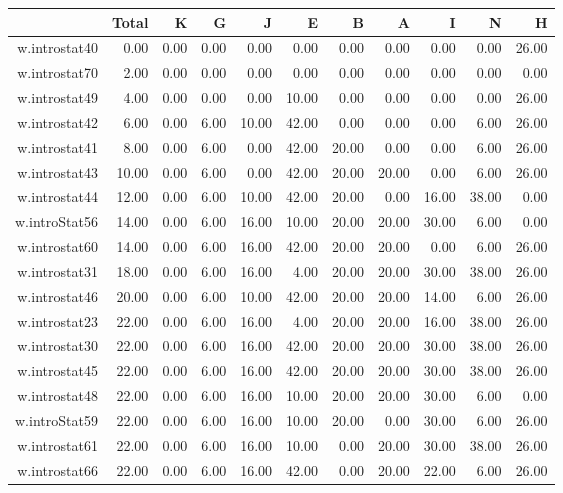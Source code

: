 \documentclass[12pt,english,nohyper]{tufte-handout}\usepackage[]{graphicx}\usepackage[]{color}
\begin{document}
\begin{longtable}{rrrrrrrrrrr}
  \hline
 & Total & K & G & J & E & B & A & I & N & H \\ 
  \hline
w.introstat40 & 0.00 & 0.00 & 0.00 & 0.00 & 0.00 & 0.00 & 0.00 & 0.00 & 0.00 & 26.00 \\ 
  w.introstat70 & 2.00 & 0.00 & 0.00 & 0.00 & 0.00 & 0.00 & 0.00 & 0.00 & 0.00 & 0.00 \\ 
  w.introstat49 & 4.00 & 0.00 & 0.00 & 0.00 & 10.00 & 0.00 & 0.00 & 0.00 & 0.00 & 26.00 \\ 
  w.introstat42 & 6.00 & 0.00 & 6.00 & 10.00 & 42.00 & 0.00 & 0.00 & 0.00 & 6.00 & 26.00 \\ 
  w.introstat41 & 8.00 & 0.00 & 6.00 & 0.00 & 42.00 & 20.00 & 0.00 & 0.00 & 6.00 & 26.00 \\ 
  w.introstat43 & 10.00 & 0.00 & 6.00 & 0.00 & 42.00 & 20.00 & 20.00 & 0.00 & 6.00 & 26.00 \\ 
  w.introstat44 & 12.00 & 0.00 & 6.00 & 10.00 & 42.00 & 20.00 & 0.00 & 16.00 & 38.00 & 0.00 \\ 
  w.introStat56 & 14.00 & 0.00 & 6.00 & 16.00 & 10.00 & 20.00 & 20.00 & 30.00 & 6.00 & 0.00 \\ 
  w.introstat60 & 14.00 & 0.00 & 6.00 & 16.00 & 42.00 & 20.00 & 20.00 & 0.00 & 6.00 & 26.00 \\ 
  w.introstat31 & 18.00 & 0.00 & 6.00 & 16.00 & 4.00 & 20.00 & 20.00 & 30.00 & 38.00 & 26.00 \\ 
  w.introstat46 & 20.00 & 0.00 & 6.00 & 10.00 & 42.00 & 20.00 & 20.00 & 14.00 & 6.00 & 26.00 \\ 
  w.introstat23 & 22.00 & 0.00 & 6.00 & 16.00 & 4.00 & 20.00 & 20.00 & 16.00 & 38.00 & 26.00 \\ 
  w.introstat30 & 22.00 & 0.00 & 6.00 & 16.00 & 42.00 & 20.00 & 20.00 & 30.00 & 38.00 & 26.00 \\ 
  w.introstat45 & 22.00 & 0.00 & 6.00 & 16.00 & 42.00 & 20.00 & 20.00 & 30.00 & 38.00 & 26.00 \\ 
  w.introstat48 & 22.00 & 0.00 & 6.00 & 16.00 & 10.00 & 20.00 & 20.00 & 30.00 & 6.00 & 0.00 \\ 
  w.introStat59 & 22.00 & 0.00 & 6.00 & 16.00 & 10.00 & 20.00 & 0.00 & 30.00 & 6.00 & 26.00 \\ 
  w.introstat61 & 22.00 & 0.00 & 6.00 & 16.00 & 10.00 & 0.00 & 20.00 & 30.00 & 38.00 & 26.00 \\ 
  w.introstat66 & 22.00 & 0.00 & 6.00 & 16.00 & 42.00 & 0.00 & 20.00 & 22.00 & 6.00 & 26.00 \\ 

\end{longtable}
\end{document}
